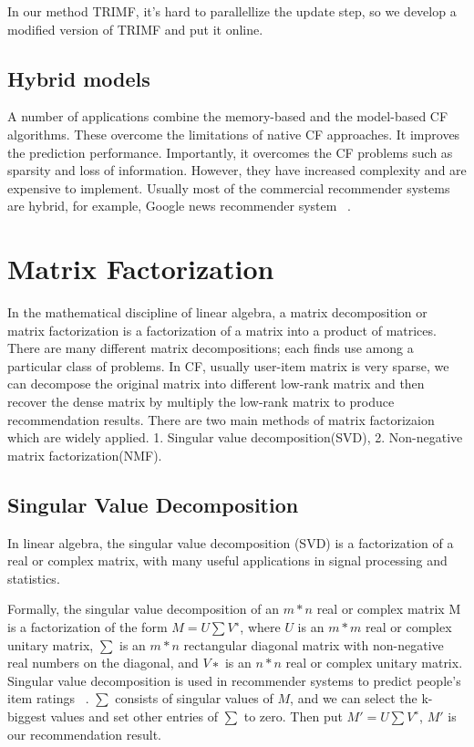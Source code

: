 In our method TRIMF, it's hard to parallellize the update step, so we develop a modified version of TRIMF and put it online.

\hspace{0.05in}
\subsection{Hybrid models}
A number of applications combine the memory-based and the model-based CF algorithms. These overcome the limitations of native CF approaches. It improves the prediction performance. Importantly, it overcomes the CF problems such as sparsity and loss of information. However, they have increased complexity and are expensive to implement. Usually most of the commercial recommender systems are hybrid, for example, Google news recommender system ~\cite{das2007google}.

\hspace{0.1in}
\section{Matrix Factorization}
In the mathematical discipline of linear algebra, a matrix decomposition or matrix factorization is a factorization of a matrix into a product of matrices. There are many different matrix decompositions; each finds use among a particular class of problems. In CF, usually user-item matrix is very sparse, we can decompose the original matrix into different low-rank matrix and then recover the dense matrix by multiply the low-rank matrix to produce recommendation results. There are two main methods of matrix factorizaion which are widely applied. 1. Singular value decomposition(SVD), 2. Non-negative matrix factorization(NMF).
\hspace{0.05in}
\subsection{Singular Value Decomposition}
In linear algebra, the singular value decomposition (SVD) is a factorization of a real or complex matrix, with many useful applications in signal processing and statistics.

Formally, the singular value decomposition of an $m * n$ real or complex matrix M is a factorization of the form $M = U \sum V^∗$, where $U$ is an $m * m$ real or complex unitary matrix, $\sum$ is an $m * n$ rectangular diagonal matrix with non-negative real numbers on the diagonal, and $V∗$ is an $n * n$ real or complex unitary matrix. Singular value decomposition is used in recommender systems to predict people's item ratings ~\cite{Sarwar00applicationof}. $\sum$ consists of singular values of $M$, and we can select the k-biggest values and set other entries of $\sum$ to zero. Then put $M' = U \sum V^∗$, $M'$ is our recommendation result.

